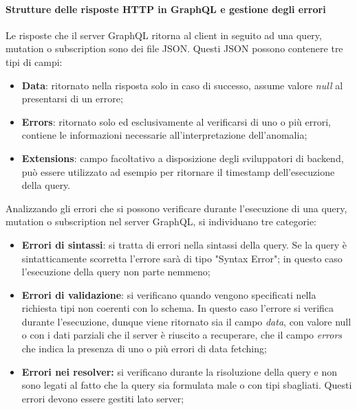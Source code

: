 \paragraph{Strutture delle risposte HTTP in GraphQL e gestione degli errori}
Le risposte che il server GraphQL ritorna al client in seguito ad una query, mutation o subscription sono dei file JSON. Questi JSON possono contenere tre tipi di campi:
\begin{itemize}
  \item \textbf{Data}: ritornato nella risposta solo in caso di successo, assume valore \textit{null} al presentarsi di un errore;
  \item \textbf{Errors}: ritornato solo ed esclusivamente al verificarsi di uno o più errori, contiene le informazioni necessarie all'interpretazione dell'anomalia;
  \item \textbf{Extensions}: campo facoltativo a disposizione degli sviluppatori di backend, può essere utilizzato ad esempio per ritornare il timestamp dell'esecuzione della query.
\end{itemize}
Analizzando gli errori che si possono verificare durante l'esecuzione di una query, mutation o subscription nel server GraphQL, si individuano tre categorie:
\begin{itemize}
  \item \textbf{Errori di sintassi}: si tratta di errori nella sintassi della query. Se la query è sintatticamente scorretta l'errore sarà di tipo "Syntax Error"; in questo caso l'esecuzione della query non parte nemmeno;
  \item \textbf{Errori di validazione}: si verificano quando vengono specificati nella richiesta tipi non coerenti con lo schema. In questo caso l'errore si verifica durante l'esecuzione, dunque viene ritornato sia il campo \textit{data}, con valore null o con i dati parziali che il server è riuscito a recuperare, che il campo \textit{errors} che indica la presenza di uno o più errori di data fetching;
  \item \textbf{Errori nei resolver:} si verificano durante la risoluzione della query e non sono legati al fatto che la query sia formulata male o con tipi sbagliati. Questi errori devono essere gestiti lato server;
\end{itemize}
